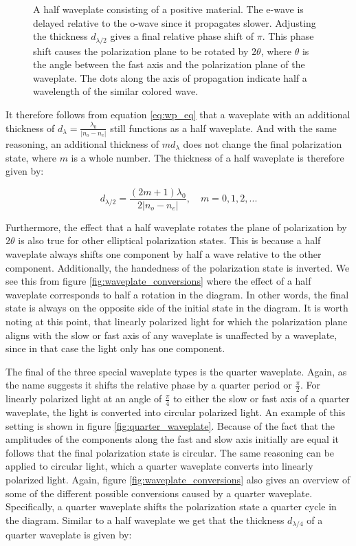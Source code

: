 \begin{figure}[h]
    \centering
    
    \caption{A half waveplate consisting of a positive material. The e-wave is delayed relative to the o-wave since it propagates slower. Adjusting the thickness $d_{\lambda/2}$ gives a final relative phase shift of $\pi$. This phase shift causes the polarization plane to be rotated by $2\theta$, where $\theta$ is the angle between the fast axis and the polarization plane of the waveplate. The dots along the axis of propagation indicate half a wavelength of the similar colored wave.}
    \label{fig:half_waveplate}
\end{figure}

It therefore follows from equation \ref{eq:wp_eq} that a waveplate with an additional thickness of $d_{\lambda}=\frac{\lambda_0}{|n_o - n_e|}$ still functions as a half waveplate. And with the same reasoning, an additional thickness of $md_{\lambda}$ does not change the final polarization state, where $m$ is a whole number. The thickness of a half waveplate is therefore given by:

\begin{equation}
    \label{eq:thickness_half_waveplate}
    d_{\lambda/2} = \frac{(2m+1)\lambda_0}{2|n_o - n_e|}, \quad m=0,1,2,... 
\end{equation}

Furthermore, the effect that a half waveplate rotates the plane of polarization by $2\theta$ is also true for other elliptical polarization states. This is because a half waveplate always shifts one component by half a wave relative to the other component. Additionally, the handedness of the polarization state is inverted. We see this from figure \ref{fig:waveplate_conversions} where the effect of a half waveplate corresponds to half a rotation in the diagram. In other words, the final state is always on the opposite side of the initial state in the diagram. It is worth noting at this point, that linearly polarized light for which the polarization plane aligns with the slow or fast axis of any waveplate is unaffected by a waveplate, since in that case the light only has one component.

The final of the three special waveplate types is the quarter waveplate. Again, as the name suggests it shifts the relative phase by a quarter period or $\frac{\pi}{2}$. For linearly polarized light at an angle of $\frac{\pi}{4}$ to either the slow or fast axis of a quarter waveplate, the light is converted into circular polarized light. An example of this setting is shown in figure \ref{fig:quarter_waveplate}. Because of the fact that the amplitudes of the components along the fast and slow axis initially are equal it follows that the final polarization state is circular. The same reasoning can be applied to circular light, which a quarter waveplate converts into linearly polarized light. Again, figure \ref{fig:waveplate_conversions} also gives an overview of some of the different possible conversions caused by a quarter waveplate. Specifically, a quarter waveplate shifts the polarization state a quarter cycle in the diagram. Similar to a half waveplate we get that the thickness $d_{\lambda/4}$ of a quarter waveplate is given by:

